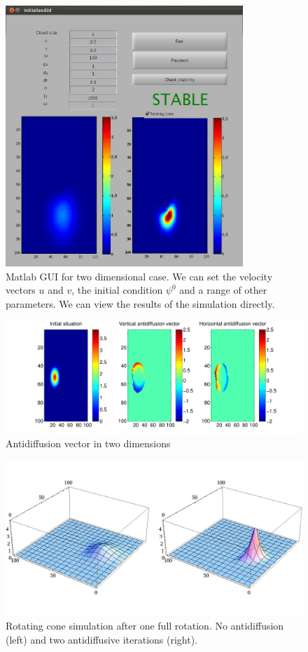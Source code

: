 \documentclass[10pt, a4paper]{article}
\begin{document}
\begin{figure}
\centering
 \includegraphics[width=0.8\textwidth]{2dscreenshot.jpg}
 \caption{Matlab GUI for two dimensional case. We can set the velocity vectors $u$ and $v$, the initial condition $\psi^0$ and a range of other parameters. We can view the results of the simulation directly.}
 \label{fig:2dgui}
\end{figure}

\begin{figure}
\centering
 \includegraphics[width=\textwidth]{../presentation/ad2d.pdf}
\caption{Antidiffusion vector in two dimensions}
\label{fig:antivec2d}
\end{figure}


\begin{figure}
\centering
 \includegraphics[width=\textwidth]{../presentation/animation2/anim-64}
\caption{Rotating cone simulation after one full rotation. No antidiffusion (left) and two antidiffusive iterations (right).}
\label{fig:rotcone}
\end{figure}
\end{document}
